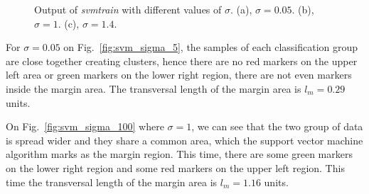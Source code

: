\documentclass[letterpaper, 10 pt, conference]{ieeeconf}  %
\begin{document}
\begin{figure}[ht!]
 \begin{center}
         \caption{Output of \emph{svmtrain} with different values of $\sigma$. (a), $\sigma = 0.05$. (b), $\sigma = 1$. (c), $\sigma = 1.4$.}
 \end{center}
\end{figure}

For $\sigma = 0.05$ on Fig.~\ref{fig:svm_sigma_5}, the samples of each classification group are close together creating clusters, hence 
there are no red markers on the upper left area or green markers on the lower right region, there are not even markers inside the 
margin area. The transversal length of the margin area is  $l_{m} = 0.29$ units.

On  Fig.~\ref{fig:svm_sigma_100} where  $\sigma = 1$, we can see that the two group of data is spread wider and they share a common 
area, which the support vector machine algorithm marks as the margin region. This time, there are some green markers on the lower right 
region and some red markers on the upper left region. This time the transversal length of the margin area is $l_{m} = 1.16$ units.
\end{document}
